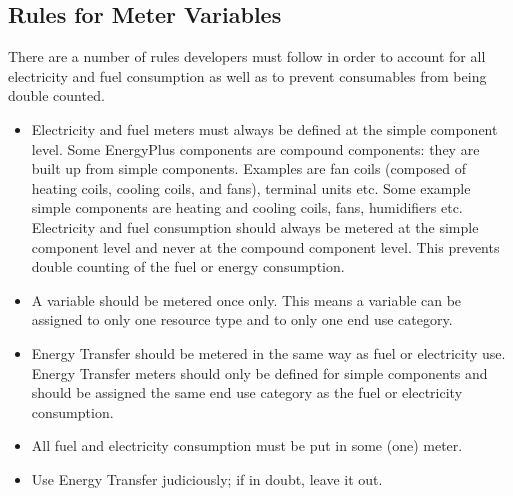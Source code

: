 \subsection{Rules for Meter Variables}\label{rules-for-meter-variables}

There are a number of rules developers must follow in order to account for all electricity and fuel consumption as well as to prevent consumables from being double counted.

\begin{itemize}
\item
Electricity and fuel meters must always be defined at the simple component level. Some EnergyPlus components are compound components: they are built up from simple components. Examples are fan coils (composed of heating coils, cooling coils, and fans), terminal units etc. Some example simple components are heating and cooling coils, fans, humidifiers etc. Electricity and fuel consumption should always be metered at the simple component level and never at the compound component level. This prevents double counting of the fuel or energy consumption.
\item
A variable should be metered once only. This means a variable can be assigned to only one resource type and to only one end use category.
\item
Energy Transfer should be metered in the same way as fuel or electricity use. Energy Transfer meters should only be defined for simple components and should be assigned the same end use category as the fuel or electricity consumption.
\item
All fuel and electricity consumption must be put in some (one) meter.
\item
Use Energy Transfer judiciously; if in doubt, leave it out.
\end{itemize}
